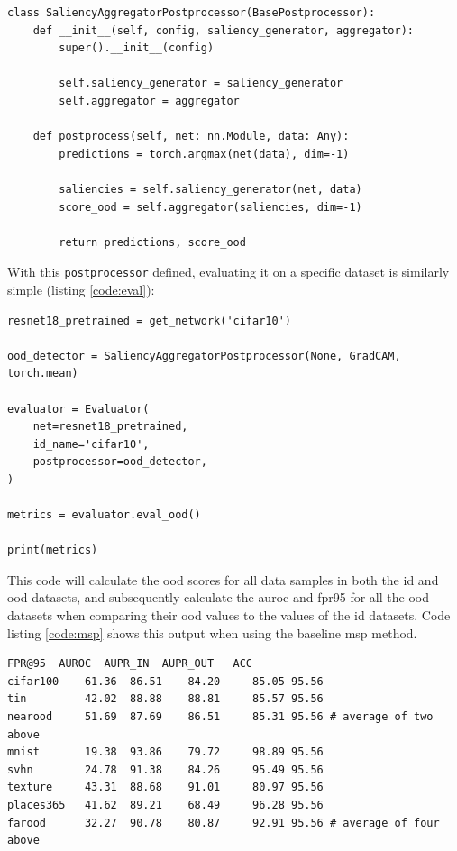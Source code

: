 \documentclass[UKenglish]{uiomasterthesis} %
\theoremstyle{definition}
\begin{document}
\begin{lstlisting}[style=pythonstyle, caption={Source code listing for the Aggregate of Saliency \ac{ood} detector}, captionpos=b, label={code:aggregate}]
class SaliencyAggregatorPostprocessor(BasePostprocessor):
    def __init__(self, config, saliency_generator, aggregator):
        super().__init__(config)

        self.saliency_generator = saliency_generator
        self.aggregator = aggregator

    def postprocess(self, net: nn.Module, data: Any):
        predictions = torch.argmax(net(data), dim=-1)

        saliencies = self.saliency_generator(net, data)
        score_ood = self.aggregator(saliencies, dim=-1)

        return predictions, score_ood
\end{lstlisting}

With this \texttt{postprocessor} defined, evaluating it on a specific dataset is similarly simple (listing \ref{code:eval}):

\begin{lstlisting}[style=pythonstyle, caption={Source code listing for evaluating methods within the OpenOOD framework}, captionpos=b, label={code:eval}]
resnet18_pretrained = get_network('cifar10')

ood_detector = SaliencyAggregatorPostprocessor(None, GradCAM, torch.mean)

evaluator = Evaluator(
    net=resnet18_pretrained,
    id_name='cifar10',
    postprocessor=ood_detector,
)

metrics = evaluator.eval_ood()

print(metrics)
\end{lstlisting}

This code will calculate the \ac{ood} scores for all data samples in both the \ac{id} and \ac{ood} datasets, and subsequently calculate the \ac{auroc} and \ac{fpr95} for all the \ac{ood} datasets when comparing their \ac{ood} values to the values of the \ac{id} datasets. Code listing \ref{code:msp} shows this output when using the baseline \ac{msp} method.

\begin{lstlisting}[style=pythonstyle, caption={Output of calling \texttt{evaluator.eval\_ood} with CIFAR10 as the dataset and \ac{msp} as the detector}, captionpos=b, label={code:msp}]
           FPR@95  AUROC  AUPR_IN  AUPR_OUT   ACC
cifar100    61.36  86.51    84.20     85.05 95.56
tin         42.02  88.88    88.81     85.57 95.56
nearood     51.69  87.69    86.51     85.31 95.56 # average of two above
mnist       19.38  93.86    79.72     98.89 95.56
svhn        24.78  91.38    84.26     95.49 95.56
texture     43.31  88.68    91.01     80.97 95.56
places365   41.62  89.21    68.49     96.28 95.56
farood      32.27  90.78    80.87     92.91 95.56 # average of four above
\end{lstlisting}
\end{document}
